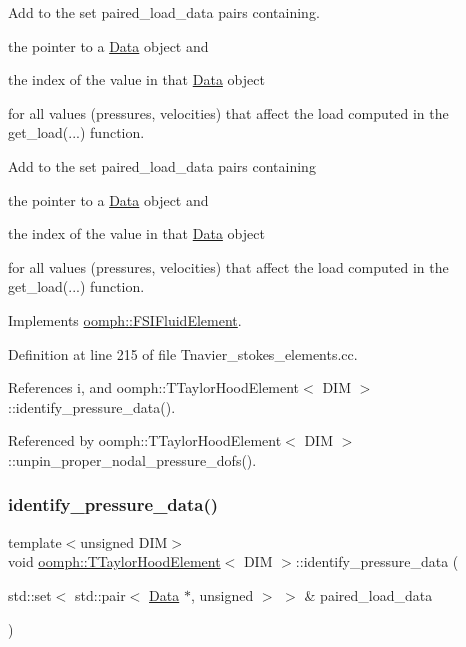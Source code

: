 Add to the set {\ttfamily paired\+\_\+load\+\_\+data} pairs containing. 


\begin{DoxyItemize}
\item the pointer to a \hyperlink{classoomph_1_1Data}{Data} object and
\item the index of the value in that \hyperlink{classoomph_1_1Data}{Data} object
\end{DoxyItemize}for all values (pressures, velocities) that affect the load computed in the {\ttfamily get\+\_\+load}(...) function.

Add to the set {\ttfamily paired\+\_\+load\+\_\+data} pairs containing
\begin{DoxyItemize}
\item the pointer to a \hyperlink{classoomph_1_1Data}{Data} object and
\item the index of the value in that \hyperlink{classoomph_1_1Data}{Data} object
\end{DoxyItemize}for all values (pressures, velocities) that affect the load computed in the {\ttfamily get\+\_\+load}(...) function. 

Implements \hyperlink{classoomph_1_1FSIFluidElement_a13c5f835cddd1b78e6d2582733619300}{oomph\+::\+F\+S\+I\+Fluid\+Element}.



Definition at line 215 of file Tnavier\+\_\+stokes\+\_\+elements.\+cc.



References i, and oomph\+::\+T\+Taylor\+Hood\+Element$<$ D\+I\+M $>$\+::identify\+\_\+pressure\+\_\+data().



Referenced by oomph\+::\+T\+Taylor\+Hood\+Element$<$ D\+I\+M $>$\+::unpin\+\_\+proper\+\_\+nodal\+\_\+pressure\+\_\+dofs().

\mbox{\label{classoomph_1_1TTaylorHoodElement_ab1d985e874073ad6900655563dbfacab}} 
\subsubsection{\texorpdfstring{identify\+\_\+pressure\+\_\+data()}{identify\_pressure\_data()}}
{\footnotesize\ttfamily template$<$unsigned D\+IM$>$ \\
void \hyperlink{classoomph_1_1TTaylorHoodElement}{oomph\+::\+T\+Taylor\+Hood\+Element}$<$ D\+IM $>$\+::identify\+\_\+pressure\+\_\+data (\begin{DoxyParamCaption}\item[{std\+::set$<$ std\+::pair$<$ \hyperlink{classoomph_1_1Data}{Data} $\ast$, unsigned $>$ $>$ \&}]{paired\+\_\+load\+\_\+data }\end{DoxyParamCaption})\hspace{0.3cm}{\ttfamily [virtual]}}




